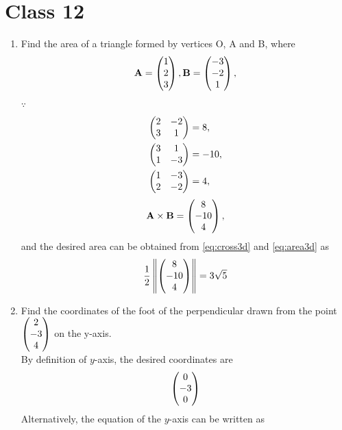\documentclass[journal,12pt,twocolumn]{IEEEtran}
\renewcommand\thesection{\arabic{section}}
\begin{document}
\section{Class 12}
\renewcommand{\theequation}{\theenumi}
\begin{enumerate}[label=\thesection.\arabic*.,ref=\thesection.\theenumi]
	\item Find the area of a triangle formed by vertices O, A and B, where 
		\begin{align}
			\mathbf{A} = \begin{pmatrix}1 \\ 2 \\ 3\end{pmatrix},
			\mathbf{B}  = \begin{pmatrix}-3 \\ -2 \\ 1\end{pmatrix},
		\end{align}
\solution $\because $
		\begin{align}
			\begin{pmatrix}2 & -2 \\ 3 & 1 \end{pmatrix} &= 8,
\\
			\begin{pmatrix}3 & 1 \\ 1 & -3 \end{pmatrix} &= -10,
			\\
			\begin{pmatrix}1 & -3 \\ 2 & -2 \end{pmatrix} &= 4,
		\end{align}
		\begin{align}
			\mathbf{A}  \times 
			\mathbf{B}  = \begin{pmatrix}8 \\ -10 \\ 4\end{pmatrix},
		\end{align}
		and the  desired area can be obtained from 
  \eqref{eq:cross3d} and 
  \eqref{eq:area3d} as
		\begin{align}
			\frac{1}{2}\left\lVert\begin{pmatrix}8 \\ -10 \\ 4\end{pmatrix}\right\rVert = 3 \sqrt{5}
		\end{align}
	\item  Find the coordinates of the foot of the perpendicular drawn from the point $ \begin{pmatrix}2 \\-3 \\4 \end{pmatrix} $ on the y-axis.
		\\
\solution By definition of $y$-axis, the desired coordinates are 
		\begin{align}
			\begin{pmatrix}0 \\ -3 \\ 0\end{pmatrix} 
		\end{align}
	Alternatively, the equation of the $y$-axis can be written as	
		\begin{align}

\end{align}
\end{enumerate}
\end{document}
